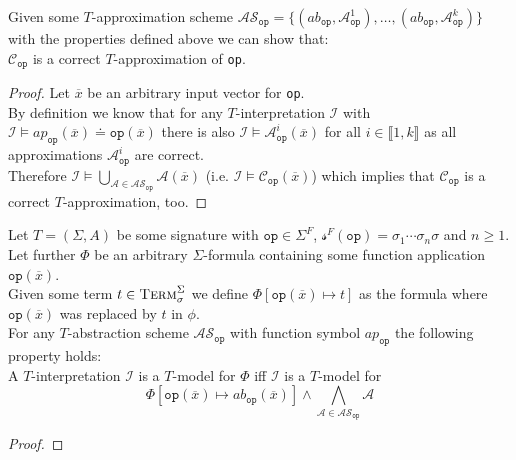 \begin{lemma}
Given some $T$-approximation scheme 
$\mathcal{AS}_{\texttt{op}} = \{ \left(ab_{\texttt{op}}, \mathcal{A}^1_{\texttt{op}}\right),\dots,\left(ab_{\texttt{op}}, \mathcal{A}^k_{\texttt{op}}\right) \}$
with the properties defined above we can show that:\\
$\mathcal{C}_{\texttt{op}}$ is a correct $T$-approximation of \texttt{op}.
\begin{proof}
Let $\overline{x}$ be an arbitrary input vector for \texttt{op}.\\
By definition we know that for any $T$-interpretation $\mathcal{I}$ with $\mathcal{I} \vDash ap_{\texttt{op}}\left(\overline{x}\right) \doteq \texttt{op}\left(\overline{x}\right)$ there is also $\mathcal{I} \vDash \mathcal{A}^i_{\texttt{op}}\left(\overline{x}\right)$ for all $i\in\llbracket1,k\rrbracket$ as all approximations $\mathcal{A}^i_{\texttt{op}}$ are correct.\\
Therefore $\mathcal{I} \vDash \bigcup\limits_{\mathcal{A}\in\mathcal{AS}_{\texttt{op}}} \mathcal{A}\left(\overline{x}\right)$ (i.e. $\mathcal{I} \vDash \mathcal{C}_{\texttt{op}}\left(\overline{x}\right)$) which implies that $\mathcal{C}_{\texttt{op}}$ is a correct $T$-approximation, too.
\end{proof}
\end{lemma}

\begin{lemma}
\end{lemma}

\begin{theorem}
\label{theorem:abstractions:scheme:equivalence}
Let $T=\left(\Sigma,A\right)$ be some signature with $\texttt{op}\in\Sigma^F$, $\mathcal{s}^F\left(\texttt{op}\right)=\sigma_1\dotsi\sigma_n\sigma$ and $n\geq1$.\\
Let further $\Phi$ be an arbitrary $\Sigma$-formula containing some function application $\texttt{op}\left(\overline{x}\right)$.\\
Given some term $t\in\textsc{Term}_\sigma^\Sigma$ we define $\Phi\left[\texttt{op}\left(\overline{x}\right)\mapsto t \right]$ as the formula where $\texttt{op}\left(\overline{x}\right)$ was replaced by $t$ in $\phi$.\\
For any $T$-abstraction scheme $\mathcal{AS}_{\texttt{op}}$ with function symbol $ap_{\texttt{op}}$ the following property holds:\\
A $T$-interpretation $\mathcal{I}$ is a $T$-model for $\Phi$ iff $\mathcal{I}$ is a $T$-model for 
\[
\Phi\left[ \texttt{op}\left(\overline{x}\right) \mapsto ab_{\texttt{op}}\left(\overline{x}\right) \right] \land \bigwedge\limits_{\mathcal{A}\in\mathcal{AS}_{\texttt{op}}} \mathcal{A}
\]
\begin{proof}
\end{proof}
\end{theorem}

